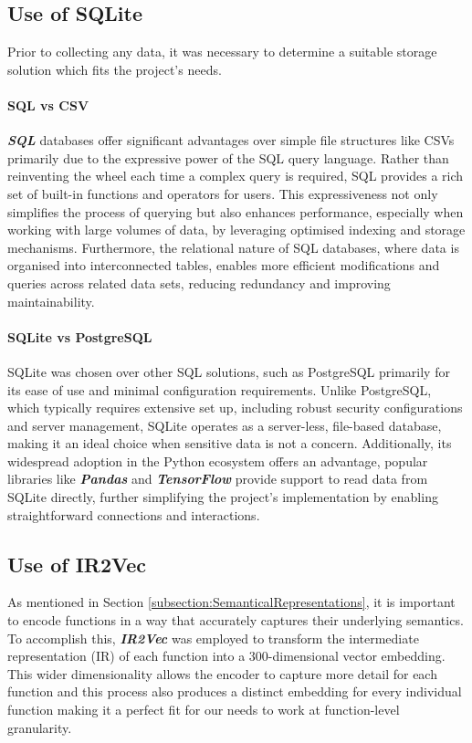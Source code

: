 \subsection{Use of SQLite}
Prior to collecting any data, it was necessary to determine a suitable storage solution which fits the project's needs.

\paragraph{SQL vs CSV} \textbf{\textit{SQL}} databases offer significant advantages over simple file structures like CSVs primarily due to the expressive power of the SQL query language. Rather than reinventing the wheel each time a complex query is required, SQL provides a rich set of built-in functions and operators for users. This expressiveness not only simplifies the process of querying but also enhances performance, especially when working with large volumes of data, by leveraging optimised indexing and storage mechanisms. Furthermore, the relational nature of SQL databases, where data is organised into interconnected tables, enables more efficient modifications and queries across related data sets, reducing redundancy and improving maintainability.

\paragraph{SQLite vs PostgreSQL} SQLite was chosen over other SQL solutions, such as PostgreSQL primarily for its ease of use and minimal configuration requirements. Unlike PostgreSQL, which typically requires extensive set up, including robust security configurations and server management, SQLite operates as a server-less, file-based database, making it an ideal choice when sensitive data is not a concern. Additionally, its widespread adoption in the Python ecosystem offers an advantage, popular libraries like \textbf{\textit{Pandas}} and \textbf{\textit{TensorFlow}} provide support to read data from SQLite directly, further simplifying the project's implementation by enabling straightforward connections and interactions.

\subsection{Use of IR2Vec} \label{subsection:UseOfIR2Vec}
As mentioned in Section \ref{subsection:SemanticalRepresentations}, it is important to encode functions in a way that accurately captures their underlying semantics. To accomplish this, \textbf{\textit{IR2Vec}} was employed to transform the intermediate representation (IR) of each function into a 300-dimensional vector embedding. This wider dimensionality allows the encoder to capture more detail for each function and this process also produces a distinct embedding for every individual function making it a perfect fit for our needs to work at function-level granularity.

